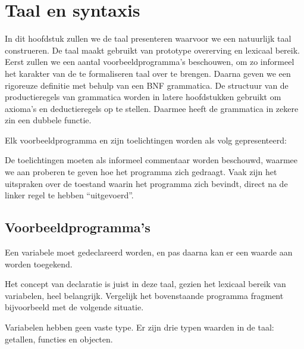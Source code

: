 
\chapter{Taal en syntaxis}

In dit hoofdstuk zullen we de taal presenteren waarvoor we een natuurlijk taal construeren. De taal maakt gebruikt van prototype overerving en lexicaal bereik. Eerst zullen we een aantal voorbeeldprogramma's beschouwen, om zo informeel het karakter van de te formaliseren taal over te brengen. Daarna geven we een rigoreuze definitie met behulp van een BNF grammatica. De structuur van de productieregels van grammatica worden in latere hoofdstukken gebruikt om axioma's en deductieregels op te stellen. Daarmee heeft de grammatica in zekere zin een dubbele functie.

Elk voorbeeldprogramma en zijn toelichtingen worden als volg gepresenteerd:

\codeFragmentCaption
{}

De toelichtingen moeten als informeel commentaar worden beschouwd, waarmee we aan proberen te geven hoe het programma zich gedraagt. Vaak zijn het uitspraken over de toestand waarin het programma zich bevindt, direct na de linker regel te hebben ``uitgevoerd''.

\section{Voorbeeldprogramma's}
\label{sec:voorbeelden}

Een variabele moet gedeclareerd worden, en pas daarna kan er een waarde aan worden toegekend.

\newCodeFragment
{}

Het concept van declaratie is juist in deze taal, gezien het lexicaal bereik van variabelen, heel belangrijk. Vergelijk het bovenstaande programma fragment bijvoorbeeld met de volgende situatie.

Variabelen hebben geen vaste type. Er zijn drie typen waarden in de taal: getallen, functies en objecten.

